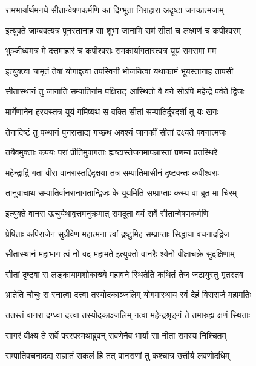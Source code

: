 \twolineshloka
{रामभार्यार्थमनघे सीतान्वेषणकर्मणि}
{कां दिग्भूता निराहारा अदृष्टा जनकात्मजाम्} %

\twolineshloka
{इत्युक्ते जाम्बवत्यत्र पुनस्तानाह सा शुभा}
{जानामि रामं सीतां च लक्ष्मणं च कपीश्वरम्} %

\twolineshloka
{भुञ्जीध्वमत्र मे दत्तमाहारं च कपीश्वराः}
{रामकार्यागतास्त्वत्र यूयं रामसमा मम} %

\twolineshloka
{इत्युक्त्वा चामृतं तेषां योगाद्दत्वा तपस्विनी}
{भोजयित्वा यथाकामं भूयस्तानाह तापसी} %

\twolineshloka
{सीतास्थानं तु जानाति सम्पातिर्नाम पक्षिराट्}
{आस्थितो वै वने सोऽपि महेन्द्रे पर्वते द्विजः} %

\twolineshloka
{मार्गेणानेन हरयस्तत्र यूयं गमिष्यथ}
{स वक्ति सीतां सम्पातिर्दूरदर्शी तु यः खगः} %

\twolineshloka
{तेनादिष्टं तु पन्थानं पुनरासाद्य गच्छथ}
{अवश्यं जानकीं सीतां द्रक्ष्यते पवनात्मजः} %

\twolineshloka
{तयैवमुक्ताः कपयः परां प्रीतिमुपागताः}
{ह्यष्टास्तेजनमापन्नास्तां प्रणम्य प्रतस्थिरे} %

\twolineshloka
{महेन्द्राद्रिं गता वीरा वानरास्तद्दिदृक्षया}
{तत्र सम्पातिमासीनं दृष्टवन्तः कपीश्वराः} %

\twolineshloka
{तानुवाचाथ सम्पातिर्वानरानागतान्द्विजः}
{के यूयमिति सम्प्राप्ताः कस्य वा ब्रूत मा चिरम्} %

\twolineshloka
{इत्युक्ते वानरा ऊचुर्यथावृत्तमनुक्रमात्}
{रामदूता वयं सर्वे सीतान्वेषणकर्मणि} %

\twolineshloka
{प्रेषिताः कपिराजेन सुग्रीवेण महात्मना}
{त्वां द्रष्टुमिह सम्प्राप्ताः सिद्धाया वचनादद्विज} %

\twolineshloka
{सीतास्थानं महाभाग त्वं नो वद महामते}
{इत्युक्तो वानरैः श्येनो वीक्षाचक्रे सुदक्षिणाम्} %

\twolineshloka
{सीतां दृष्ट्वा स लङ्कायामशोकाख्ये महावने}
{स्थितेति कथितं तेज जटायुस्तु मृतस्तव} %

\twolineshloka
{भ्रातेति चोचुः स स्नात्वा दत्त्वा तस्योदकाञ्जलिम्}
{योगमास्थाय स्वं देहं विससर्ज महामतिः} %

\twolineshloka
{ततस्तं वानरा दग्ध्वा दत्त्वा तस्योदकाञ्जलिम्}
{गत्वा महेन्द्रश्रृङ्गं ते तमारुह्य क्षणं स्थिताः} %

\twolineshloka
{सागरं वीक्ष्य ते सर्वे परस्परमथाब्रुवन्}
{रावणेनैव भार्या सा नीता रामस्य निश्चितम्} %

\twolineshloka
{सम्पातिवचनादद्य सज्ञातं सकलं हि तत्}
{वानराणां तु कश्चात्र उत्तीर्य लवणोदधिम्} %

